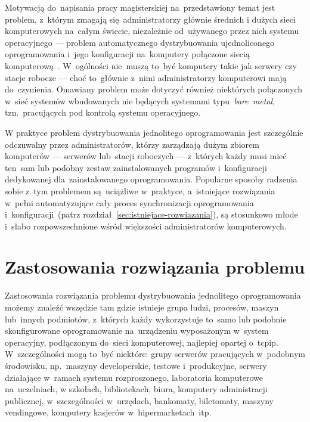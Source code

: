 \documentclass[thesis]{subfiles}
\begin{document}
Motywacją do~napisania pracy magisterskiej na~przedstawiony temat jest problem, z~którym zmagają się~administratorzy głównie średnich i dużych sieci komputerowych na~całym świecie, niezależnie od~używanego przez nich systemu operacyjnego --- problem automatycznego dystrybuowania ujednoliconego oprogramowania i~jego konfiguracji na~komputery połączone siecią komputerową~\cite{so-problem-intro}. W~ogólności nie~muszą to~być komputery takie jak serwery czy stacje robocze --- choć to~głównie z~nimi administratorzy komputerowi mają do~czynienia. Omawiany problem może dotyczyć również niektórych połączonych w~sieć systemów wbudowanych nie będących systemami typu~\mbox{\emph{bare~metal}}, tzn.~pracujących pod kontrolą systemu operacyjnego.

W praktyce problem dystrybuowania jednolitego oprogramowania jest szczególnie odczuwalny przez administratorów, którzy zarządzają dużym zbiorem komputerów --- serwerów lub~stacji roboczych --- z~których każdy musi mieć ten~sam lub podobny zestaw zainstalowanych programów i~konfiguracji dedykowanej dla~zainstalowanego oprogramowania. Popularne sposoby radzenia sobie z~tym problemem są~uciążliwe w~praktyce, a~istniejące rozwiązania w~pełni automatyzujące cały proces synchronizacji oprogramowania i~konfiguracji~(patrz rozdział~\ref{sec:istniejace-rozwiazania}), są stosunkowo młode i~słabo rozpowszechnione wśród większości administratorów komputerowych.


\section{Zastosowania rozwiązania problemu}

Zastosowania rozwiązania problemu dystrybuowania jednolitego oprogramowania możemy znaleźć wszędzie tam gdzie istnieje grupa ludzi, procesów, maszyn lub~innych podmiotów, z~których każdy wykorzystuje to~samo lub podobnie skonfigurowane oprogramowanie na~urządzeniu wyposażonym w~system operacyjny, podłączonym do~sieci komputerowej, najlepiej opartej o~\gls{tcpip}. W~szczególności mogą to~być niektóre: grupy serwerów pracujących w~podobnym środowisku, np.~maszyny developerskie, testowe i~produkcyjne, serwery działające w~ramach systemu rozproszonego, laboratoria komputerowe na~uczelniach, w szkołach, bibliotekach, biura, komputery administracji publicznej, w~szczególności w~urzędach, bankomaty, biletomaty, maszyny vendingowe, komputery kasjerów w~hipermarketach~itp.
\end{document}

